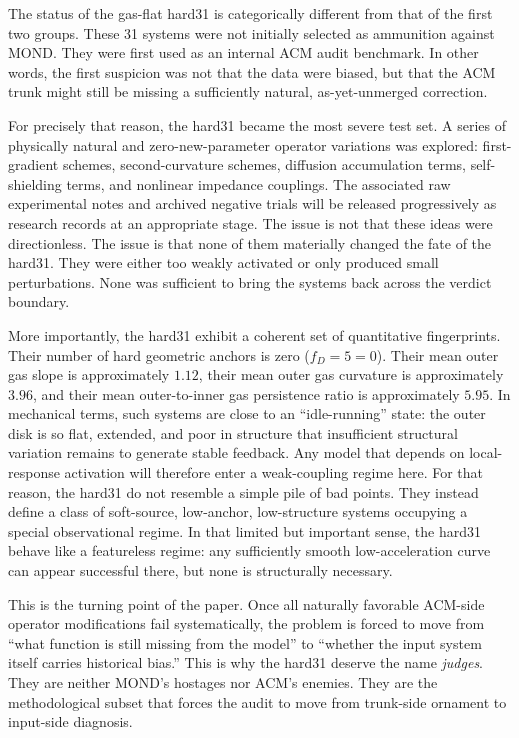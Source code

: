 ﻿\documentclass[aps,prd,twocolumn,superscriptaddress,longbibliography,nofootinbib,floatfix,10pt]{revtex4-2}
\begin{document}
The status of the gas-flat hard31 is categorically different from that of the
first two groups. These 31 systems were not initially selected as ammunition
against MOND. They were first used as an internal ACM audit benchmark. In
other words, the first suspicion was not that the data were biased, but that
the ACM trunk might still be missing a sufficiently natural, as-yet-unmerged
correction.

For precisely that reason, the hard31 became the most severe test set. A series
of physically natural and zero-new-parameter operator variations was explored:
first-gradient schemes, second-curvature schemes, diffusion accumulation terms,
self-shielding terms, and nonlinear impedance couplings. The associated raw
experimental notes and archived negative trials will be released
progressively as research records at an appropriate stage. The issue is not
that these ideas were directionless. The issue is that none of them
materially changed the fate of the hard31. They were either too weakly
activated or only produced small perturbations. None was sufficient to bring
the systems back across the verdict boundary.

More importantly, the hard31 exhibit a coherent set of quantitative
fingerprints. Their number of hard geometric anchors is zero ($f_D=5=0$). Their
mean outer gas slope is approximately $1.12$, their mean outer gas curvature is
approximately $3.96$, and their mean outer-to-inner gas persistence ratio is
approximately $5.95$. In mechanical terms, such systems are close to an
``idle-running'' state: the outer disk is so flat, extended, and poor in
structure that insufficient structural variation remains to generate stable
feedback. Any model that depends on local-response activation will therefore
enter a weak-coupling regime here. For that reason, the hard31 do not resemble
a simple pile of bad points. They instead define a class of soft-source,
low-anchor, low-structure systems occupying a special observational regime. In
that limited but important sense, the hard31 behave like a featureless regime:
any sufficiently smooth low-acceleration curve can appear successful there,
but none is structurally necessary.

This is the turning point of the paper. Once all naturally favorable ACM-side
operator modifications fail systematically, the problem is forced to move from
``what function is still missing from the model'' to ``whether the input system
itself carries historical bias.'' This is why the hard31 deserve the name
\emph{judges}. They are neither MOND's hostages nor ACM's enemies. They are the
methodological subset that forces the audit to move from trunk-side ornament to
input-side diagnosis.
\end{document}

